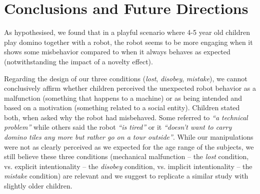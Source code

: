 \documentclass[letterpaper, 10pt, conference]{ieeeconf}
\begin{document}
\section{Conclusions and Future Directions}


As hypothesised, we found that in a playful scenario where 4-5 year old children
play domino together with a robot, the robot seems to be more engaging when it
shows some misbehavior compared to when it always behaves as expected
(notwithstanding the impact of a novelty effect).

Regarding the design of our three conditions (\emph{lost}, \emph{disobey},
\emph{mistake}), we cannot conclusively affirm whether children perceived the
unexpected robot behavior as a malfunction (something that happens to a machine)
or as being intended and based on a motivation (something related to a social
entity). Children stated both, when asked why the robot had misbehaved.  Some
referred to \textit{``a technical problem''} while others said the robot
\textit{``is tired''} or it \textit{``doesn't want to carry domino tiles any
more but rather go on a tour outside''}. While our manipulations were not as
clearly perceived as we expected for the age range of the subjects, we still
believe these three conditions (mechanical malfunction -- the \emph{lost}
condition, vs. explicit intentionality -- the \emph{disobey} condition, vs.
implicit intentionality -- the \emph{mistake} condition) are relevant and we
suggest to replicate a similar study with slightly older children.


\end{document}
